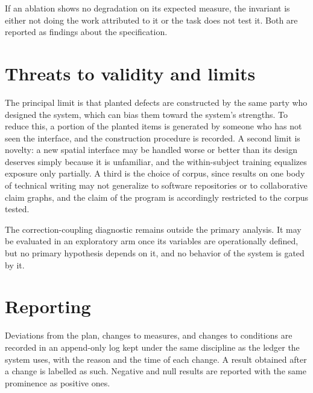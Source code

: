 \documentclass[11pt]{article}
\theoremstyle{definition}
\begin{document}
If an ablation shows no degradation on its expected measure, the invariant is either not doing the work attributed to it or the task does not test it. Both are reported as findings about the specification.

\section{Threats to validity and limits}

The principal limit is that planted defects are constructed by the same party who designed the system, which can bias them toward the system's strengths. To reduce this, a portion of the planted items is generated by someone who has not seen the interface, and the construction procedure is recorded. A second limit is novelty: a new spatial interface may be handled worse or better than its design deserves simply because it is unfamiliar, and the within-subject training equalizes exposure only partially. A third is the choice of corpus, since results on one body of technical writing may not generalize to software repositories or to collaborative claim graphs, and the claim of the program is accordingly restricted to the corpus tested.

The correction-coupling diagnostic remains outside the primary analysis. It may be evaluated in an exploratory arm once its variables are operationally defined, but no primary hypothesis depends on it, and no behavior of the system is gated by it.

\section{Reporting}

Deviations from the plan, changes to measures, and changes to conditions are recorded in an append-only log kept under the same discipline as the ledger the system uses, with the reason and the time of each change. A result obtained after a change is labelled as such. Negative and null results are reported with the same prominence as positive ones.
\end{document}
